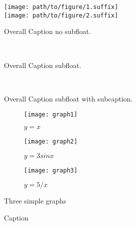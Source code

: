 \begin{figure}[ht]
    \center
    \texttt{[image: path/to/figure/1.suffix]}\\
    \texttt{[image: path/to/figure/2.suffix]}
    \caption{Overall Caption no subfloat.}
\label{fig:no_subfloat}
\end{figure}

\begin{figure}[ht]
    \center
    \\
    \caption{Overall Caption subfloat.}
\label{fig:subfloat}
\end{figure}

\begin{figure}[ht]
    \center
    \\
    \caption{Overall Caption subfloat with subcaption.}
\label{fig:subfloat_subcaption}
\end{figure}

\begin{figure}
    \centering
    \begin{subfigure}[b]{0.3\textwidth}
        \centering
        \texttt{[image: graph1]}
        \caption{$y=x$}
        \label{fig:y equals x}
    \end{subfigure}
    \hfill
    \begin{subfigure}[b]{0.3\textwidth}
        \centering
        \texttt{[image: graph2]}
        \caption{$y=3sinx$}
        \label{fig:three sin x}
    \end{subfigure}
    \hfill
    \begin{subfigure}[b]{0.3\textwidth}
        \centering
        \texttt{[image: graph3]}
        \caption{$y=5/x$}
        \label{fig:five over x}
    \end{subfigure}
       \caption{Three simple graphs}
       \label{fig:three graphs}
\end{figure}


\begin{figure}
    \centering
    \hfill
    \hfill
    \hfill
    \caption{Caption}
\end{figure}
